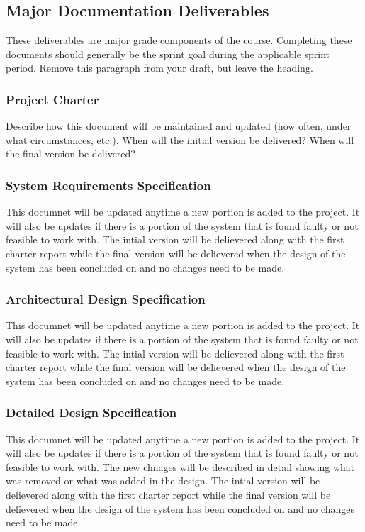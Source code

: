 
\subsection{Major Documentation Deliverables}
These deliverables are major grade components of the course. Completing these documents should generally be the sprint goal during the applicable sprint period. Remove this paragraph from your draft, but leave the heading.

\subsubsection{Project Charter}
Describe how this document will be maintained and updated (how often, under what circumstances, etc.). When will the initial version be delivered? When will the final version be delivered?

\subsubsection{System Requirements Specification}
This documnet will be updated anytime a new portion is added to the project. It will also be updates if there is a portion of the system that is found faulty or not feasible to work with. The intial version will be delievered along with the first charter report while the final version will be delievered when the design of the system has been concluded on and no changes need to be made.

\subsubsection{Architectural Design Specification}
This documnet will be updated anytime a new portion is added to the project. It will also be updates if there is a portion of the system that is found faulty or not feasible to work with. The intial version will be delievered along with the first charter report while the final version will be delievered when the design of the system has been concluded on and no changes need to be made.

\subsubsection{Detailed Design Specification}
This documnet will be updated anytime a new portion is added to the project. It will also be updates if there is a portion of the system that is found faulty or not feasible to work with. The new chnages will be described in detail showing what was removed or what was added in the design. The intial version will be delievered along with the first charter report while the final version will be delievered when the design of the system has been concluded on and no changes need to be made.

